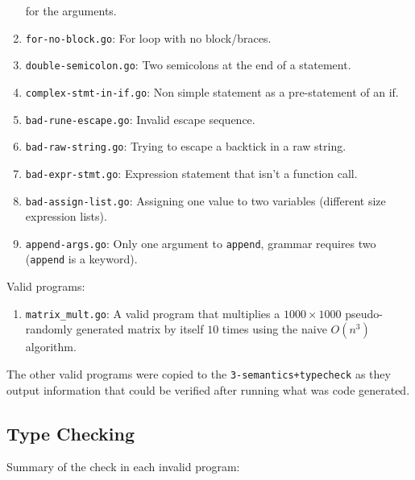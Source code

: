 \documentclass[11pt]{article}
\begin{document}
\begin{enumerate}
  for the arguments.
\item \texttt{for-no-block.go}: For loop with no block/braces.
\item \texttt{double-semicolon.go}: Two semicolons at the end of a
  statement.
\item \texttt{complex-stmt-in-if.go}: Non simple statement as a
  pre-statement of an if.
\item \texttt{bad-rune-escape.go}: Invalid escape sequence.
\item \texttt{bad-raw-string.go}: Trying to escape a backtick in a raw
  string.
\item \texttt{bad-expr-stmt.go}: Expression statement that isn't a
  function call.
\item \texttt{bad-assign-list.go}: Assigning one value to two
  variables (different size expression lists).
\item \texttt{append-args.go}: Only one argument to \texttt{append},
  grammar requires two (\texttt{append} is a keyword).
\end{enumerate}
Valid programs:
\begin{enumerate}
\item \texttt{matrix\_mult.go}: A valid program that multiplies a $1000
  \times 1000$ pseudo-randomly generated matrix by itself $10$ times
  using the naive $O(n^3)$ algorithm.
\end{enumerate}
The other valid programs were copied to the
\texttt{3-semantics+typecheck} as they output information that could
be verified after running what was code generated.

\subsection*{Type Checking}

Summary of the check in each invalid program:
\end{document}
